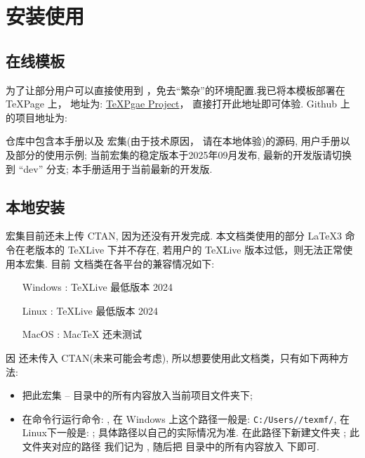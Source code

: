 \clearpage
\section{安装使用}
\subsection{在线模板}
为了让部分用户可以直接使用到 \ztex{}，免去``繁杂''的环境配置.我已将本模板部署在 \TeX{}Page 上，
地址为: \href{https://www.texpage.com/share/e420ac8364a640b78231d65c9d5d7090}{TeXPgae \ztex{}  Project}，
直接打开此地址即可体验. Github 上的项目地址为:

\begin{center}
\end{center}

仓库中包含本手册以及 \zTikZ{} 宏集(由于技术原因，\zTikZ{} 请在本地体验)的源码, 用户手册以及部分的使用示例; 
当前宏集的稳定版本于2025年09月发布, 最新的开发版请切换到 ``dev'' 分支; 本手册适用于当前最新的开发版.


\subsection{本地安装}
\ztex{} 宏集目前还未上传 CTAN, 因为还没有开发完成. 本文档类使用的部分
\LaTeX3 命令在老版本的 \TeX{}Live 下并不存在, 若用户的 \TeX{}Live 版本过低，则无法正常使用本宏集. 
目前 \ztex{} 文档类在各平台的兼容情况如下:

\hspace*{12em}\parbox{8cm}{
\begin{itemize}
  \item[Windows]: \TeX{}Live 最低版本 2024
  \item[Linux]: \TeX{}Live 最低版本 2024
  \item[MacOS]: Mac{}\TeX{} 还未测试
\end{itemize}}

因 \ztex{} 还未传入 CTAN(未来可能会考虑), 所以想要使用此文档类，只有如下两种方法:
\begin{itemize}
    \item 把此宏集 --  目录中的所有内容放入当前项目文件夹下;
    \item 在命令行运行命令: , 在 Windows 上这个路径一般是: \texttt{C:/Users//texmf/}, 
      在Linux下一般是: ; 具体路径以自己的实际情况为准. 在此路径下新建文件夹 ; 此文件夹对应的路径
      我们记为 , 随后把  目录中的所有内容放入  下即可.
\end{itemize}

